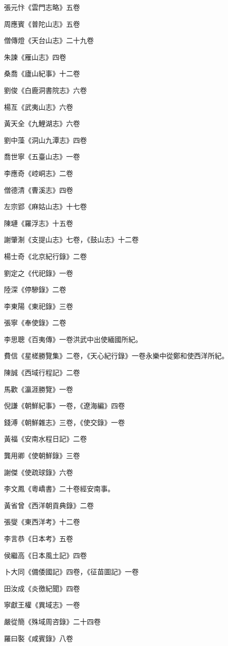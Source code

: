 張元忭《雲門志略》五卷

周應賓《普陀山志》五卷

僧傳燈《天台山志》二十九卷

朱諫《雁山志》四卷

桑喬《廬山紀事》十二卷

劉俊《白鹿洞書院志》六卷

楊亙《武夷山志》六卷

黃天全《九鯉湖志》六卷

劉中藻《洞山九潭志》四卷

喬世寧《五臺山志》一卷

李應奇《崆峒志》二卷

僧德清《曹溪志》四卷

左宗郢《麻姑山志》十七卷

陳璉《羅浮志》十五卷

謝肇淛《支提山志》七卷，《鼓山志》十二卷

楊士奇《北京紀行錄》二卷

劉定之《代祀錄》一卷

陸深《停驂錄》二卷

李東陽《東祀錄》三卷

張寧《奉使錄》二卷

李思聰《百夷傳》一卷洪武中出使緬國所紀。

費信《星槎勝覽集》二卷，《天心紀行錄》一卷永樂中從鄭和使西洋所紀。

陳誠《西域行程記》二卷

馬歡《瀛涯勝覽》一卷

倪謙《朝鮮紀事》一卷，《遼海編》四卷

錢溥《朝鮮雜志》三卷，《使交錄》一卷

黃福《安南水程日記》二卷

龔用卿《使朝鮮錄》三卷

謝傑《使疏球錄》六卷

李文鳳《粵嶠書》二十卷經安南事。

黃省曾《西洋朝貢典錄》二卷

張燮《東西洋考》十二卷

李言恭《日本考》五卷

侯繼高《日本風土記》四卷

卜大同《備倭國記》四卷，《征苗圖記》一卷

田汝成《炎徼紀聞》四卷

寧獻王權《異域志》一卷

嚴從簡《殊域周咨錄》二十四卷

羅曰褧《咸賓錄》八卷

